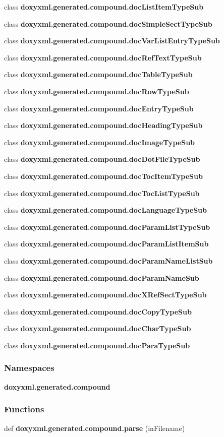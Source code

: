 \begin{DoxyCompactItemize}
class {\bf doxyxml.\+generated.\+compound.\+doc\+List\+Item\+Type\+Sub}
\item 
class {\bf doxyxml.\+generated.\+compound.\+doc\+Simple\+Sect\+Type\+Sub}
\item 
class {\bf doxyxml.\+generated.\+compound.\+doc\+Var\+List\+Entry\+Type\+Sub}
\item 
class {\bf doxyxml.\+generated.\+compound.\+doc\+Ref\+Text\+Type\+Sub}
\item 
class {\bf doxyxml.\+generated.\+compound.\+doc\+Table\+Type\+Sub}
\item 
class {\bf doxyxml.\+generated.\+compound.\+doc\+Row\+Type\+Sub}
\item 
class {\bf doxyxml.\+generated.\+compound.\+doc\+Entry\+Type\+Sub}
\item 
class {\bf doxyxml.\+generated.\+compound.\+doc\+Heading\+Type\+Sub}
\item 
class {\bf doxyxml.\+generated.\+compound.\+doc\+Image\+Type\+Sub}
\item 
class {\bf doxyxml.\+generated.\+compound.\+doc\+Dot\+File\+Type\+Sub}
\item 
class {\bf doxyxml.\+generated.\+compound.\+doc\+Toc\+Item\+Type\+Sub}
\item 
class {\bf doxyxml.\+generated.\+compound.\+doc\+Toc\+List\+Type\+Sub}
\item 
class {\bf doxyxml.\+generated.\+compound.\+doc\+Language\+Type\+Sub}
\item 
class {\bf doxyxml.\+generated.\+compound.\+doc\+Param\+List\+Type\+Sub}
\item 
class {\bf doxyxml.\+generated.\+compound.\+doc\+Param\+List\+Item\+Sub}
\item 
class {\bf doxyxml.\+generated.\+compound.\+doc\+Param\+Name\+List\+Sub}
\item 
class {\bf doxyxml.\+generated.\+compound.\+doc\+Param\+Name\+Sub}
\item 
class {\bf doxyxml.\+generated.\+compound.\+doc\+X\+Ref\+Sect\+Type\+Sub}
\item 
class {\bf doxyxml.\+generated.\+compound.\+doc\+Copy\+Type\+Sub}
\item 
class {\bf doxyxml.\+generated.\+compound.\+doc\+Char\+Type\+Sub}
\item 
class {\bf doxyxml.\+generated.\+compound.\+doc\+Para\+Type\+Sub}
\end{DoxyCompactItemize}
\subsubsection*{Namespaces}
\begin{DoxyCompactItemize}
\item 
 {\bf doxyxml.\+generated.\+compound}
\end{DoxyCompactItemize}
\subsubsection*{Functions}
\begin{DoxyCompactItemize}
\item 
def {\bf doxyxml.\+generated.\+compound.\+parse} (in\+Filename)
\end{DoxyCompactItemize}

